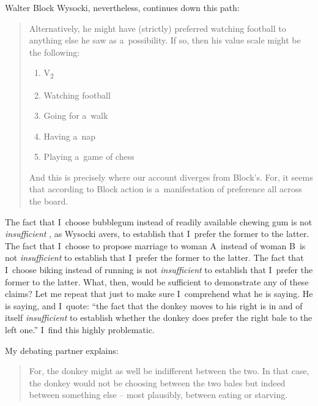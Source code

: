 \begin{artengenv}{Walter Block}
Wysocki, nevertheless, continues down this path:



\begin{quote}
Alternatively, he might have (strictly) preferred watching football to anything else he saw as a~possibility. If so, then his value scale might be the following:
\vspace{-.7em}
\begin{enumerate}[label=(\arabic*)]

\item[]\makebox[-1.7em][l]{}V\textsubscript{2}

\item Watching football

\item Going for a~walk

\item Having a~nap

\item Playing a~game of chess

\end{enumerate}
\vspace{-.7em}
And this is precisely where our account diverges from Block's. For, it seems that according to Block action is a~manifestation of preference all across the board.
\end{quote}



The fact that I~choose bubblegum instead of readily available chewing gum is not \textit{insufficient} , as Wysocki avers, to establish that I~prefer the former to the latter. The fact that I~choose to propose marriage to woman A~instead of woman B~is not \textit{insufficient} to establish that I~prefer the former to the latter. The fact that I~choose biking instead of running is not \textit{insufficient} to establish that I~prefer the former to the latter. What, then, would be sufficient to demonstrate any of these claims? Let me repeat that just to make sure I~comprehend what he is saying. He is saying, and I~quote: ``the fact that the donkey moves to his right is in and of itself \textit{insufficient} to establish whether the donkey does prefer the right bale to the left one.'' I~find this highly problematic.



My debating partner explains:



\begin{quote}
For, the donkey might as well be indifferent between the two. In that case, the donkey would not be choosing between the two bales but indeed between something else -- most plausibly, between eating or starving.
\end{quote}




\end{artengenv}
